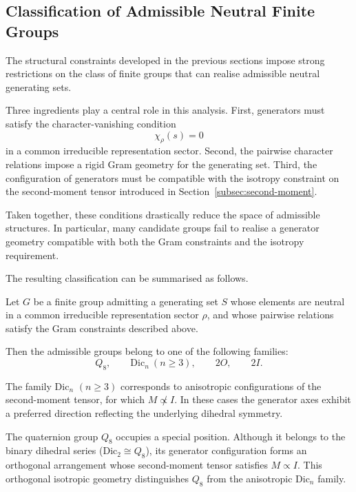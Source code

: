 \subsection{Classification of Admissible Neutral Finite Groups}
  \label{subsec:classification-neutral-groups}

  The structural constraints developed in the previous sections impose strong
  restrictions on the class of finite groups that can realise admissible
  neutral generating sets.

  Three ingredients play a central role in this analysis.
  First, generators must satisfy the character-vanishing condition
  \[
    \chi_\rho(s)=0
  \]
  in a common irreducible representation sector.
  Second, the pairwise character relations impose a rigid Gram geometry for
  the generating set.
  Third, the configuration of generators must be compatible with the isotropy
  constraint on the second-moment tensor introduced in
  Section~\ref{subsec:second-moment}.

  Taken together, these conditions drastically reduce the space of admissible
  structures.
  In particular, many candidate groups fail to realise a generator geometry
  compatible with both the Gram constraints and the isotropy requirement.

  The resulting classification can be summarised as follows.

  \begin{theorem}
    Let $G$ be a finite group admitting a generating set $S$ whose elements are
    neutral in a common irreducible representation sector $\rho$, and whose
    pairwise relations satisfy the Gram constraints described above.

    Then the admissible groups belong to one of the following families:
    \[
      Q_8,\qquad \mathrm{Dic}_n\ (n\ge 3),\qquad 2O,\qquad 2I .
    \]
  \end{theorem}

  The family $\mathrm{Dic}_n$ $(n\ge 3)$ corresponds to anisotropic
  configurations of the second-moment tensor, for which
  $M \not\propto I$.
  In these cases the generator axes exhibit a preferred direction
  reflecting the underlying dihedral symmetry.

  The quaternion group $Q_8$ occupies a special position.
  Although it belongs to the binary dihedral series
  ($\mathrm{Dic}_2 \cong Q_8$), its generator configuration forms an
  orthogonal arrangement whose second-moment tensor satisfies
  $M \propto I$.
  This orthogonal isotropic geometry distinguishes $Q_8$ from the
  anisotropic $\mathrm{Dic}_n$ family.

